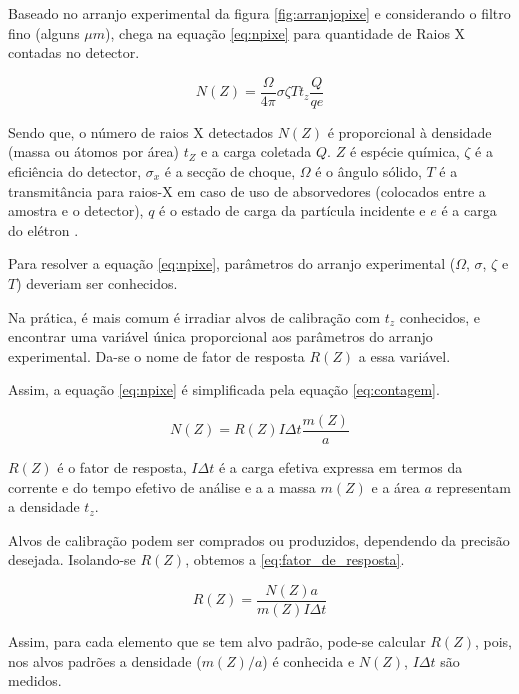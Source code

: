 Baseado no arranjo experimental da figura \ref{fig:arranjopixe} e
considerando o filtro fino (alguns $\mu m$),
\cite{tabacniks2000} chega na equação \ref{eq:npixe} para quantidade de Raios X
contadas no detector. 

\begin{equation}
  \label{eq:npixe}
  N(Z) = \frac{\Omega}{4\pi} \sigma \zeta T t_z \frac{Q}{qe}
\end{equation}

Sendo que, o número de raios X detectados $N(Z)$ é proporcional à 
densidade (massa ou átomos por área) $t_Z$ e a carga coletada $Q$.
$Z$ é espécie química, $\zeta$ é a eficiência do detector, 
$\sigma_x$ é a secção de choque, $\Omega$ é o ângulo sólido, 
$T$ é a transmitância para raios-X em caso de uso de absorvedores 
(colocados entre a amostra e o detector), $q$ é o estado de carga da 
partícula incidente e $e$ é a carga do elétron \cite{tabacniks2000}.

Para resolver a equação \ref{eq:npixe}, parâmetros do arranjo experimental
($\Omega$, $\sigma$, $\zeta$ e $T$) deveriam ser conhecidos. 

Na prática, é mais comum é irradiar alvos de calibração com $t_z$ conhecidos,
e encontrar uma variável única proporcional aos parâmetros do arranjo experimental.
Da-se o nome de fator de resposta $R(Z)$ a essa variável.

Assim, a equação \ref{eq:npixe} é simplificada pela equação \ref{eq:contagem}.

\begin{equation}
  \label{eq:contagem}
  N(Z) = R(Z) I\Delta t \frac{m(Z)}{a}
\end{equation}

$R(Z)$ é o fator de resposta, $I\Delta t$ é a carga efetiva expressa
em termos da corrente e do tempo efetivo de análise e a 
a massa $m(Z)$ e a área $a$ representam a densidade $t_z$. 

Alvos de calibração podem ser comprados ou produzidos, dependendo da 
precisão desejada. Isolando-se $R(Z)$, obtemos a \ref{eq:fator_de_resposta}.

\begin{equation}
  \label{eq:fator_de_resposta}
  R(Z) = \frac{N(Z) a}{m(Z)I \Delta t}
\end{equation}

Assim, para cada elemento que se tem alvo padrão, pode-se calcular $R(Z)$,
pois, nos alvos padrões a densidade ($m(Z)/a$) é conhecida e $N(Z)$, $I \Delta t$ são medidos. 

